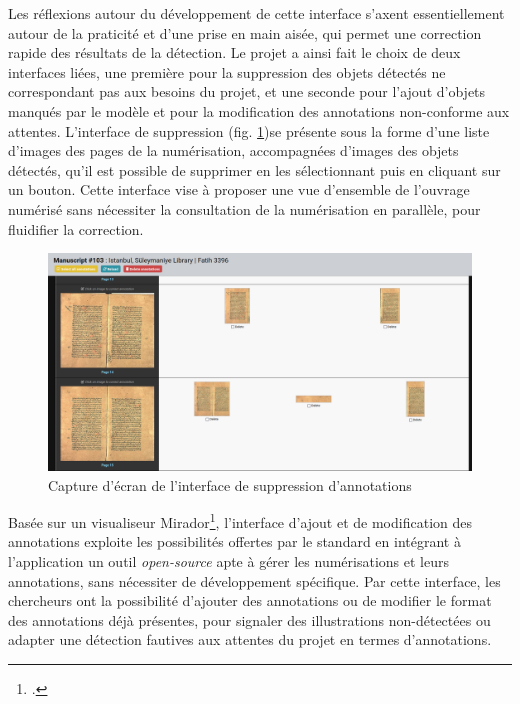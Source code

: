 	Les réflexions autour du développement de cette interface s'axent essentiellement autour de la praticité et d'une prise en main aisée, qui permet une correction rapide des résultats de la détection. Le projet \eida a ainsi fait le choix de deux interfaces liées, une première pour la suppression des objets détectés ne correspondant pas aux besoins du projet, et une seconde pour l'ajout d'objets manqués par le modèle et pour la modification des annotations non-conforme aux attentes. L'interface de suppression (fig. \ref{fig:eida_delete_anno})se présente sous la forme d'une liste d'images des pages de la numérisation, accompagnées d'images des objets détectés, qu'il est possible de supprimer en les sélectionnant puis en cliquant sur un bouton. Cette interface vise à proposer une vue d'ensemble de l'ouvrage numérisé sans nécessiter la consultation de la numérisation en parallèle, pour fluidifier la correction.
  	
  	\begin{figure}[h]
		\centering
		\includegraphics[width=16cm]{images/eida_delete_anno.png}
		\caption{Capture d'écran de l'interface \eida de suppression d'annotations}
		\label{fig:eida_delete_anno}
	\end{figure}

	Basée sur un visualiseur Mirador\footcite{MiradorHomea}, l'interface d'ajout et de modification des annotations exploite les possibilités offertes par le standard \iiif en intégrant à l'application \eida un outil \textit{open-source} apte à gérer les numérisations et leurs annotations, sans nécessiter de développement spécifique. Par cette interface, les chercheurs ont la possibilité d'ajouter des annotations ou de modifier le format des annotations déjà présentes, pour signaler des illustrations non-détectées ou adapter une détection fautives aux attentes du projet en termes d'annotations.
	
